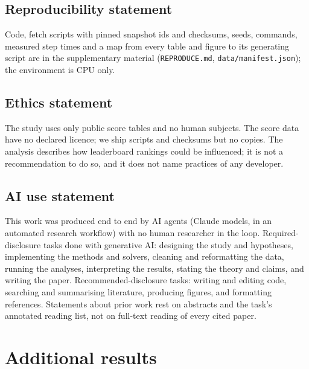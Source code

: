 \documentclass{article}
\begin{document}
\subsection*{Reproducibility statement}
Code, fetch scripts with pinned snapshot ids and checksums, seeds, commands, measured step times and a map from every table and figure to its generating script are in the supplementary material (\texttt{REPRODUCE.md}, \texttt{data/manifest.json}); the environment is CPU only.
\subsection*{Ethics statement}
The study uses only public score tables and no human subjects. The score data have no declared licence; we ship scripts and checksums but no copies. The analysis describes how leaderboard rankings could be influenced; it is not a recommendation to do so, and it does not name practices of any developer.
\subsection*{AI use statement}
This work was produced end to end by AI agents (Claude models, in an automated research workflow) with no human researcher in the loop. Required-disclosure tasks done with generative AI: designing the study and hypotheses, implementing the methods and solvers, cleaning and reformatting the data, running the analyses, interpreting the results, stating the theory and claims, and writing the paper. Recommended-disclosure tasks: writing and editing code, searching and summarising literature, producing figures, and formatting references. Statements about prior work rest on abstracts and the task's annotated reading list, not on full-text reading of every cited paper.



\appendix
\section{Additional results}
\begin{table}[h]
\caption{Median paired difference in $k_{\min}$ against the mean rule on HELM MMLU, by gain model and rule [95\% CI] (number of pairs); bold: CI above 0.}\label{tab:c2}
\centering\tiny\resizebox{\linewidth}{!}{}
\end{table}
\begin{table}[h]
\caption{Robustness grid for claim C2: median paired difference in $k_{\min}$ against the mean over feasible targets [95\% CI]; bold: CI above 0.}\label{tab:ablation}
\centering\tiny\resizebox{\linewidth}{!}{}
\end{table}
\begin{table}[h]
\caption{Median budget $k$ needed and share of attackers that reach rank 1 within the evaluated budget, gain model G1; inf: the median attacker does not.}\label{tab:baselines}
\centering\footnotesize
\end{table}
\end{document}
